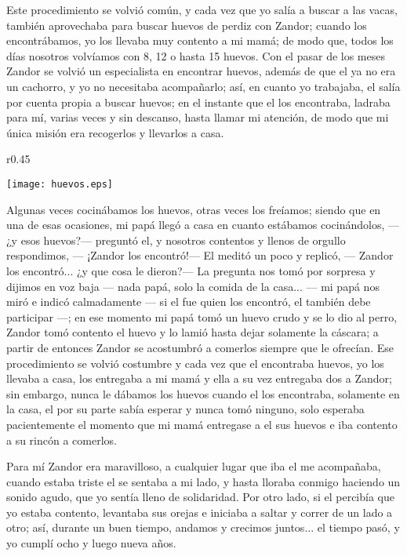 Este procedimiento se volvió común, y cada vez que yo salía a buscar a las vacas, también aprovechaba para buscar huevos de perdiz con Zandor; cuando los encontrábamos,  yo los llevaba muy contento a mi mamá; de modo que, todos los días nosotros volvíamos con 8, 12 o hasta 15 huevos.
Con el pasar de los meses Zandor se volvió un especialista en encontrar huevos, además de que el ya no era un cachorro, y yo no necesitaba acompañarlo; así, en cuanto yo trabajaba, el salía por cuenta propia a buscar huevos; en el instante que el los encontraba, ladraba para mí, varias veces y sin descanso, hasta llamar mi atención, de modo que mi única misión era recogerlos y llevarlos a casa.
\begin{wrapfigure}{r}{0.45\textwidth}
  \begin{center}
  \vspace{-20pt}
    \texttt{[image: huevos.eps]}
  \end{center}
  \vspace{-20pt}
\end{wrapfigure}
Algunas veces cocinábamos los huevos, otras veces los freíamos; siendo que en una de esas ocasiones, mi papá llegó a casa en cuanto estábamos cocinándolos, --- ¿y esos huevos?--- preguntó el, y nosotros contentos y llenos de orgullo respondimos, --- ¡Zandor los encontró!---
El meditó un poco y replicó, --- Zandor los encontró... ¿y que cosa le dieron?--- La pregunta nos tomó por sorpresa y dijimos en voz baja --- nada papá, solo la comida de la casa... --- mi papá nos miró e indicó calmadamente --- si el fue quien los encontró, el también debe participar ---;
en ese momento mi papá tomó un huevo crudo y se lo dio al perro, Zandor tomó contento el huevo y lo lamió hasta dejar solamente la cáscara; a partir de entonces Zandor se acostumbró a comerlos siempre que le ofrecían. Ese procedimiento se volvió costumbre y cada vez que el encontraba huevos, yo los llevaba a casa, los entregaba a mi mamá y ella a su vez entregaba dos a Zandor; sin embargo, nunca le dábamos los huevos cuando el los encontraba, solamente en la casa, el por su parte sabía esperar y nunca tomó ninguno, solo esperaba pacientemente el momento que mi mamá entregase a el sus huevos e iba contento a su rincón a comerlos.


Para mí Zandor era maravilloso, a cualquier lugar que iba el me acompañaba, cuando estaba triste el se sentaba a mi lado, y hasta lloraba conmigo haciendo un sonido agudo, que yo sentía lleno de solidaridad.
Por otro lado, si el percibía que yo estaba contento, levantaba sus orejas e iniciaba a saltar y correr de un lado a otro; así, durante un buen tiempo, andamos y crecimos juntos... el tiempo pasó, y yo cumplí ocho y luego nueva años.


